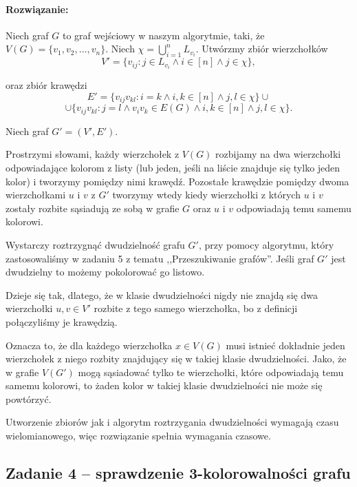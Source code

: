 \paragraph{Rozwiązanie:} 

Niech graf $G$ to graf wejściowy w naszym algorytmie, taki, że
$V(G) = \{v_1, v_2, \ldots, v_n\}$. 
Niech $\chi = \bigcup_{i = 1}^n L_{v_i}$.
Utwórzmy zbiór wierzchołków
\[V' = \{v_{ij} : j \in L_{v_i} \land i \in [n] \land j \in \chi\},\]

oraz zbiór krawędzi 
\[E' = \{v_{ij}v_{kl} : i = k \land i,k \in [n] \land j, l \in \chi\} \cup 
\]
\[\cup
\{v_{ij}v_{kl} : j = l \land v_iv_k \in E(G) \land i,k \in [n] \land j, l \in \chi\}.\]

Niech graf $G' = (V', E')$. 

Prostrzymi słowami, każdy wierzchołek z $V(G)$ rozbijamy na dwa wierzchołki odpowiadające kolorom z listy (lub jeden, jeśli na liście znajduje się tylko jeden kolor) i tworzymy pomiędzy 
nimi krawędź. Pozostałe krawędzie pomiędzy dwoma wierzchołkami
$u$ i $v$ z $G'$ tworzymy wtedy kiedy wierzchołki 
z których $u$ i $v$ zostały rozbite sąsiadują ze sobą
w grafie $G$ oraz $u$ i $v$ odpowiadają temu samemu kolorowi.

Wystarczy roztrzygnąć dwudzielność 
grafu $G'$, przy pomocy algorytmu, który zastosowaliśmy w zadaniu 5 z tematu ,,Przeszukiwanie grafów''. Jeśli graf $G'$ jest dwudzielny
to możemy pokolorować go listowo.

Dzieje się tak, dlatego, że w klasie dwudzielności nigdy
nie znajdą się dwa wierzchołki $u, v \in V'$ rozbite z tego samego wierzchołka, bo z definicji połączyliśmy je krawędzią.

Oznacza to, że dla każdego wierzchołka $x \in V(G)$ musi
istnieć dokładnie jeden wierzchołek z niego rozbity znajdujący się w takiej klasie dwudzielności. Jako, że w grafie $V(G')$
mogą sąsiadować tylko te wierzchołki, które odpowiadają temu samemu kolorowi, to żaden kolor w takiej klasie dwudzielności nie może się powtórzyć.

Utworzenie zbiorów jak i algorytm roztrzygania dwudzielności wymagają czasu wielomianowego, więc rozwiązanie spełnia wymagania czasowe.

\subsection{Zadanie 4 -- sprawdzenie 3-kolorowalności grafu}

